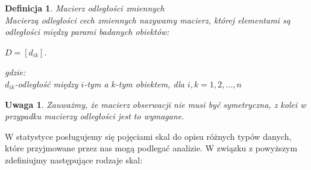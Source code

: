 \documentclass[12pt,a4paper]{report}
\newtheorem{definition}[theorem]{Definicja}
\newtheorem{uwaga}{Uwaga}
\begin{document}
\begin{definition}{Macierz odległości zmiennych \cite[Rozdział 1.6]{panek2013}}\\
Macierzą odległości cech zmiennych nazywamy macierz, której elementami są odległości między parami badanych obiektów: 
\begin{center}
$D = [d_{ik}].$
\end{center}
gdzie:\\
$d_{ik}$-odległość między $i$-tym a $k$-tym obiektem, dla $i,k=1,2,\ldots,n$
\end{definition}

\begin{uwaga}
Zauważmy, że macierz obserwacji nie musi być symetryczna, z kolei w przypadku macierzy odległości jest to wymagane.
\end{uwaga}

W statystyce posługujemy się pojęciami skal do opisu różnych typów danych, które przyjmowane przez nas mogą podlegać analizie. W związku z powyższym zdefiniujmy następujące rodzaje skal:
\end{document}
